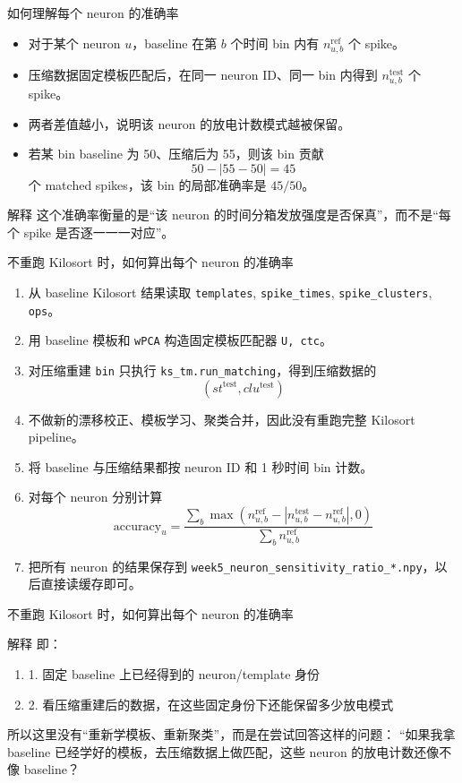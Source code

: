 \documentclass[aspectratio=169,11pt]{beamer}
\begin{document}
\begin{frame}{如何理解每个 neuron 的准确率}
  \begin{itemize}
    \item 对于某个 neuron $u$，baseline 在第 $b$ 个时间 bin 内有 $n^{\text{ref}}_{u,b}$ 个 spike。
    \item 压缩数据固定模板匹配后，在同一 neuron ID、同一 bin 内得到 $n^{\text{test}}_{u,b}$ 个 spike。
    \item 两者差值越小，说明该 neuron 的放电计数模式越被保留。
    \item 若某 bin baseline 为 50、压缩后为 55，则该 bin 贡献
    \[
      50-|55-50|=45
    \]
    个 matched spikes，该 bin 的局部准确率是 $45/50$。
  \end{itemize}
  \begin{alertblock}{解释}
    这个准确率衡量的是“该 neuron 的时间分箱发放强度是否保真”，而不是“每个 spike 是否逐一一一对应”。
  \end{alertblock}
\end{frame}

\begin{frame}{不重跑 Kilosort 时，如何算出每个 neuron 的准确率}
  \begin{enumerate}
    \item 从 baseline Kilosort 结果读取 \texttt{templates}, \texttt{spike\_times}, \texttt{spike\_clusters}, \texttt{ops}。
    \item 用 baseline 模板和 \texttt{wPCA} 构造固定模板匹配器 \texttt{U, ctc}。
    \item 对压缩重建 \texttt{bin} 只执行 \texttt{ks\_tm.run\_matching}，得到压缩数据的
    \[
      (st^{\text{test}}, clu^{\text{test}})
    \]
    \item 不做新的漂移校正、模板学习、聚类合并，因此\alert{没有重跑完整 Kilosort pipeline}。
    \item 将 baseline 与压缩结果都按 neuron ID 和 1 秒时间 bin 计数。
    \item 对每个 neuron 分别计算
    \[
      \text{accuracy}_{u}=
      \frac{\sum_b \max(n^{\text{ref}}_{u,b}-|n^{\text{test}}_{u,b}-n^{\text{ref}}_{u,b}|,0)}
           {\sum_b n^{\text{ref}}_{u,b}}
    \]
    \item 把所有 neuron 的结果保存到 \texttt{week5\_neuron\_sensitivity\_ratio\_*.npy}，以后直接读缓存即可。
  \end{enumerate}
\end{frame}
\begin{frame}{不重跑 Kilosort 时，如何算出每个 neuron 的准确率}
\begin{alertblock}{解释}
即：
  \begin{enumerate}
    \item 1. 固定 baseline 上已经得到的 neuron/template 身份
    \item 2. 看压缩重建后的数据，在这些固定身份下还能保留多少放电模式
  \end{enumerate}

  所以这里没有“重新学模板、重新聚类”，而是在尝试回答这样的问题：
  “如果我拿 baseline 已经学好的模板，去压缩数据上做匹配，这些 neuron 的放电计数还像不像 baseline？
\end{alertblock}
\end{frame}
\end{document}
